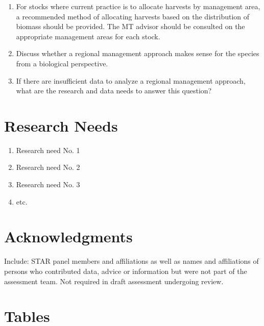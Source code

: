 \documentclass[12pt,]{article}
\providecommand{\tightlist}{%
  \setlength{\itemsep}{0pt}\setlength{\parskip}{0pt}}
\begin{document}
\begin{enumerate}
\def\labelenumi{\arabic{enumi}.}
\tightlist
\item
  For stocks where current practice is to allocate harvests by
  management area, a recommended method of allocating harvests based on
  the distribution of biomass should be provided. The MT advisor should
  be consulted on the appropriate management areas for each stock.
\item
  Discuss whether a regional management approach makes sense for the
  species from a biological perspective.
\item
  If there are insufficient data to analyze a regional management
  approach, what are the research and data needs to answer this
  question?
\end{enumerate}

\section{Research Needs}\label{research-needs}

\begin{enumerate}

\item Research need No. 1

\item Research need No. 2

\item Research need No. 3

\item etc.

\end{enumerate}

\section{Acknowledgments}\label{acknowledgments}

Include: STAR panel members and affiliations as well as names and
affiliations of persons who contributed data, advice or information but
were not part of the assessment team. Not required in draft assessment
undergoing review.

\newpage

\FloatBarrier

\section{Tables}\label{tables}

\FloatBarrier
\end{document}
